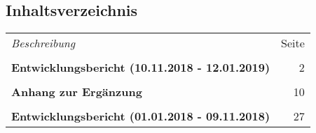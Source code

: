 \documentclass[oneside,openany,headings=optiontotoc,11pt,numbers=noenddot]{article}
\begin{document}
	\begin{center}
		\section*{Inhaltsverzeichnis}
		\begin{tabularx}{\textwidth}{Xr}
			\textit{Beschreibung} & Seite\\
			\\
			\textbf{Entwicklungsbericht (10.11.2018 - 12.01.2019)} & 2\\
			\\
			\textbf{Anhang zur Ergänzung} & 10\\
			\\
			\textbf{Entwicklungsbericht (01.01.2018 - 09.11.2018)} & 27
		\end{tabularx}
	\end{center}
	
	
	
\end{document}
